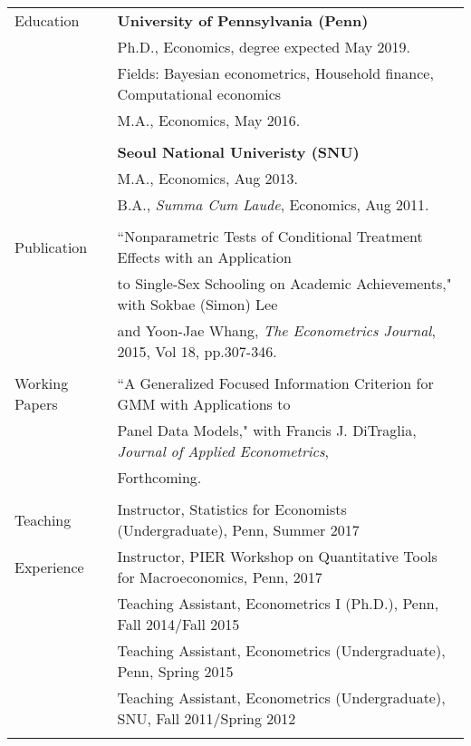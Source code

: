 \documentclass[letterpaper,11pt,oneside]{article}
\begin{document}
\noindent \begin{tabular}{@{} l l}
 \Large{Education} 
    & \textbf{University of Pennsylvania (Penn)} \\
     & Ph.D., Economics, degree expected May 2019. \\
     & Fields: Bayesian econometrics, Household finance, Computational economics \\
     & M.A., Economics, May 2016. \\
     & \\
     & \textbf{Seoul National Univeristy (SNU)} \\
          & M.A., Economics, Aug 2013. \\
     & B.A., \textit{Summa Cum Laude}, Economics, Aug 2011. \\
     \vspace{0.1in} \\
      \Large{Publication}    & ``Nonparametric Tests of Conditional Treatment Effects with an Application\\
 & to Single-Sex Schooling on Academic Achievements," with Sokbae (Simon) Lee\\
 & and Yoon-Jae Whang, \textit{The Econometrics Journal}, 2015, Vol 18, pp.307-346. \\
     \vspace{0.1in} \\
 \Large{Working Papers}    & ``A Generalized Focused Information Criterion for GMM with Applications to \\
 &Panel Data Models," with Francis J. DiTraglia, \textit{Journal of Applied Econometrics}, \\
 & Forthcoming.\\ 
     \vspace{0.1in} \\
  \Large{Teaching}    & Instructor, Statistics for Economists (Undergraduate), Penn, Summer 2017\\
  \Large{Experience} &  Instructor, PIER Workshop on Quantitative Tools for Macroeconomics, Penn, 2017\\%
      & Teaching Assistant, Econometrics I (Ph.D.), Penn, Fall 2014/Fall 2015 \\
     & Teaching Assistant, Econometrics (Undergraduate), Penn, Spring 2015\\
     & Teaching Assistant, Econometrics (Undergraduate), SNU, Fall 2011/Spring 2012\\
     \vspace{0.1in} \\

\end{tabular}
\end{document}
